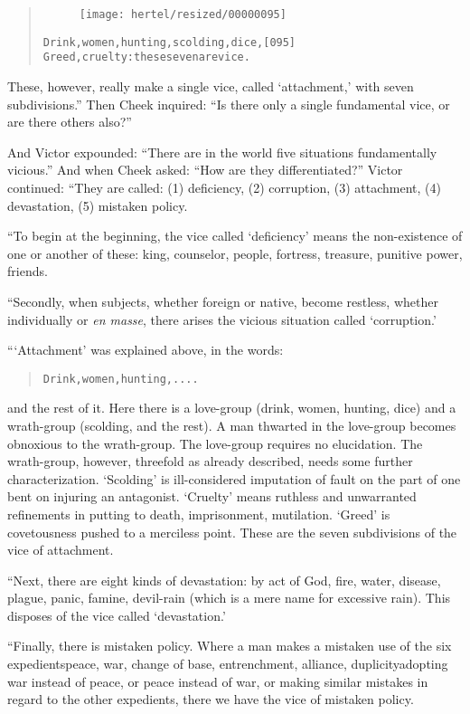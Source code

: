 \documentclass[article, twoside, 10pt]{memoir}
\renewenvironment{verbatim}{%
\begin{quote}%
\vskip -10pt%
\begin{alltt}\normalfont\small}{\end{alltt}%
\end{quote}%
\vskip -10pt
} %
\begin{document}
\begin{verbatim}
\begin{figure}[p]\texttt{[image: hertel/resized/00000095]}\end{figure}Drink, women, hunting, scolding, dice,                  [095]
Greed, cruelty: these seven are vice.
\end{verbatim}
These, however, really make a single vice, called `attachment,'
with seven subdivisions.” Then Cheek inquired:
``Is there only a single fundamental vice, or are there others also?''

And Victor expounded:
``There are in the world five situations fundamentally vicious.''
And when Cheek asked: ``How are they differentiated?'' Victor
continued: “They are called: (1) deficiency, (2) corruption, (3)
attachment, (4) devastation, (5) mistaken policy.

“To begin at the beginning, the vice called `deficiency' means the
non-existence of one or another of these: king, counselor, people,
fortress, treasure, punitive power, friends.

“Secondly, when subjects, whether foreign or native, become
restless, whether individually or \emph{en masse}, there arises the
vicious situation called `corruption.'

“`Attachment' was explained above, in the words:

\begin{verbatim}
Drink, women, hunting, ....
\end{verbatim}
and the rest of it. Here there is a love-group (drink, women,
hunting, dice) and a wrath-group (scolding, and the rest). A man
thwarted in the love-group becomes obnoxious to the wrath-group.
The love-group requires no elucidation. The wrath-group, however,
threefold as already described, needs some further
characterization. `Scolding' is ill-considered imputation of fault
on the part of one bent on injuring an antagonist. `Cruelty' means
ruthless and unwarranted refinements in putting to death,
imprisonment, mutilation. `Greed' is covetousness pushed to a
merciless point. These are the seven subdivisions of the vice of
attachment.

“Next, there are eight kinds of devastation: by act of God, fire,
water, disease, plague, panic, famine, devil-rain (which is a mere
name for excessive rain). This disposes of the vice called
`devastation.'

“Finally, there is mistaken policy. Where a man makes a mistaken
use of the six expedients{\textemdash}peace, war, change of base,
entrenchment, alliance, duplicity{\textemdash}adopting war instead of peace,
or peace instead of war, or making similar mistakes in regard to
the other expedients, there we have the vice of mistaken policy.
\end{document}
